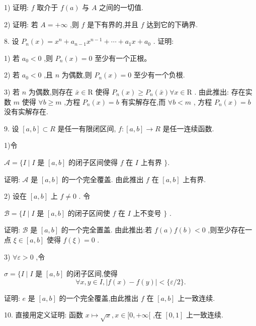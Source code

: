 1) 证明: $f$ 取介于 $f\left( a\right)$ 与 $A$ 之间的一切值.

2) 证明: 若 $A =  + \infty$ ,则 $f$ 是下有界的,并且 $f$ 达到它的下确界.

8. 设 ${P}_{n}\left( x\right)  = {x}^{n} + {a}_{n - 1}{x}^{n - 1} + \cdots  + {a}_{1}x + {a}_{0}$ . 证明:

1) 若 ${a}_{0} < 0$ ,则 ${P}_{n}\left( x\right)  = 0$ 至少有一个正根。

2) 若 ${a}_{0} < 0$ ,且 $n$ 为偶数,则 ${P}_{n}\left( x\right)  = 0$ 至少有一个负根.

3) 若 $n$ 为偶数,则存在 $\bar{x} \in  \mathrm{R}$ 使得 ${P}_{n}\left( x\right)  \geq  {P}_{n}\left( \bar{x}\right) \forall x \in  \mathrm{R}$ . 由此推出: 存在实数 $m$ 使得 $\forall b \geq  m$ ,方程 ${P}_{n}\left( x\right)  = b$ 有实解存在,而 $\forall b < m$ , 方程 ${P}_{n}\left( x\right)  = b$ 没有实解存在.

9. 设 $\left\lbrack  {a,b}\right\rbrack   \subset  R$ 是任一有限闭区间, $f : \left\lbrack  {a,b}\right\rbrack   \rightarrow  R$ 是任一连续函数.

1)令

$\mathcal{A} = \{ I \mid  I$ 是 $\left\lbrack  {a,b}\right\rbrack$ 的闭子区间使得 $f$ 在 $I$ 上有界 $\} .$

证明: $\mathcal{A}$ 是 $\left\lbrack  {a,b}\right\rbrack$ 的一个完全覆盖. 由此推出 $f$ 在 $\left\lbrack  {a,b}\right\rbrack$ 上有界.

2) 设在 $\left\lbrack  {a,b}\right\rbrack$ 上 $f \neq  0$ . 令

$\mathcal{B} = \{ I \mid  I$ 是 $\left\lbrack  {a,b}\right\rbrack$ 的闭子区间使 $f$ 在 $I$ 上不变号 $\}$ .

证明: $\mathcal{B}$ 是 $\left\lbrack  {a,b}\right\rbrack$ 的一个完全置盖. 由此推出:若 $f\left( a\right) f\left( b\right)  < 0$ ,则至少存在一点 $\xi  \in  \left\lbrack  {a,b}\right\rbrack$ 使得 $f\left( \xi \right)  = 0$ .

3) $\forall \varepsilon  > 0$ ,令

$\sigma  = \{ I \mid  I$ 是 $\left\lbrack  {a,b}\right\rbrack$ 的闭子区间,使得
$$\forall x,y \in  I,\left| {f\left( x\right)  - f\left( y\right) }\right|  < \{ \varepsilon /2\} .$$

证明: $e$ 是 $\left\lbrack  {a,b}\right\rbrack$ 的一个完全覆盖,由此推出 $f$ 在 $\left\lbrack  {a,b}\right\rbrack$ 上一致连续.

10. 直接用定义证明: 函数 $x \mapsto  \sqrt{x},x \in  \lbrack 0, + \infty \lbrack$ ,在 $\left\lbrack  {0,1}\right\rbrack$ 上一致连续.

